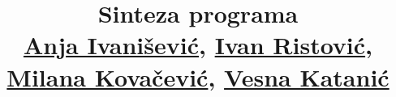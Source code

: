 \documentclass[a4paper]{report}
\newcommand{\odgovor}[1]{\textcolor{blue}{#1}}
\begin{document}
\title{Sinteza programa\\ \small{ \href{mailto:anja.ivanisevic95@gmail.com}{Anja Ivanišević}, \href{mailto:mi14031@matf.bg.ac.rs}{Ivan Ristović}, \href{mailto:mi14042@matf.bg.ac.rs}{Milana Kovačević}, \href{mailto:vesna.katanic@gmail.com}{Vesna Katanić}}}

\maketitle


\tableofcontents

%
%
%
%
%
%
\end{document}
